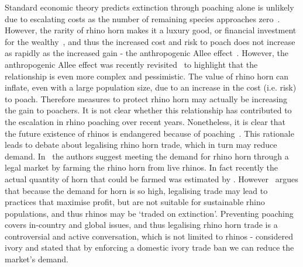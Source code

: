 \documentclass[10pt]{article}
\begin{document}
Standard economic theory predicts extinction through poaching alone is unlikely due to
escalating costs as the number of remaining species approaches zero~\cite{courchamp2006rarity}.
However, the rarity of rhino horn makes it a luxury good, or financial investment
for the wealthy~\cite{gao2016rhino}, and thus the increased cost and risk to poach
does not increase as rapidly as the increased gain - the anthropogenic
Allee effect~\cite{branch2013opportunistic, courchamp2006rarity}. However, the
anthropogenic Allee effect was recently revisited~\cite{holden2017high} to highlight
that the relationship is even more complex and pessimistic. The value of rhino horn
can inflate, even with a large population size, due to an increase in the cost (i.e. risk)
to poach. Therefore measures to protect rhino horn may actually be increasing the gain
to poachers. It is not clear whether this relationship has contributed to the escalation
in rhino poaching over recent years. Nonetheless, it is clear that the future
existence of rhinos is endangered because of poaching~\cite{Duan2013,Smith1993}.
This rationale leads to debate about legalising rhino horn trade, which in turn may
reduce demand. In~\cite{Duan2013} the authors suggest meeting the demand for rhino horn
through a legal market by farming the rhino horn from live rhinos. In fact recently
the actual quantity of horn that could be farmed was estimated by \cite{Taylor2017}.
However~\cite{crookes2016trading} argues that because the demand for horn is so high,
legalising trade may lead to practices that maximise profit, but are not suitable for
sustainable rhino populations, and thus rhinos may be `traded on extinction'.
Preventing poaching covers in-country and global issues, and thus legalising rhino
horn trade is a controversial and active conversation, which is not limited to rhinos -
\cite{Harvey2017} considered ivory and stated that by enforcing a domestic ivory
trade ban we can reduce the market's demand.
\end{document}
